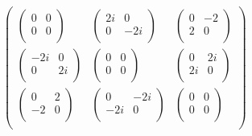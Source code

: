 \documentclass{article}
\begin{document}
\begin{doublespace}
\noindent\(\left(
\begin{array}{ccc}
 \left(
\begin{array}{cc}
 0 & 0 \\
 0 & 0 \\
\end{array}
\right) & \left(
\begin{array}{cc}
 2 i & 0 \\
 0 & -2 i \\
\end{array}
\right) & \left(
\begin{array}{cc}
 0 & -2 \\
 2 & 0 \\
\end{array}
\right) \\
 \left(
\begin{array}{cc}
 -2 i & 0 \\
 0 & 2 i \\
\end{array}
\right) & \left(
\begin{array}{cc}
 0 & 0 \\
 0 & 0 \\
\end{array}
\right) & \left(
\begin{array}{cc}
 0 & 2 i \\
 2 i & 0 \\
\end{array}
\right) \\
 \left(
\begin{array}{cc}
 0 & 2 \\
 -2 & 0 \\
\end{array}
\right) & \left(
\begin{array}{cc}
 0 & -2 i \\
 -2 i & 0 \\
\end{array}
\right) & \left(
\begin{array}{cc}
 0 & 0 \\
 0 & 0 \\
\end{array}
\right) \\
\end{array}
\right)\)
\end{doublespace}
\end{document}
